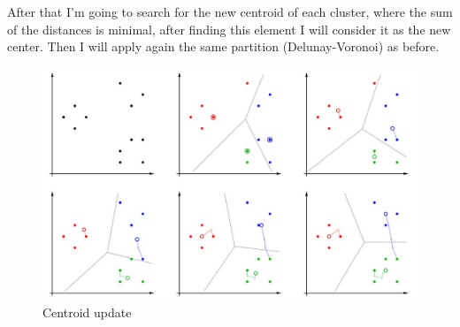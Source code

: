 \documentclass{article}
\begin{document}
After that I'm going to search for the new centroid of each cluster, where the sum of the
distances is minimal, after finding this element I will consider it as the new center.
Then I will apply again the same partition (Delunay-Voronoi) as before.
\begin{figure}[H]
    \centering
    \includegraphics[scale=0.4]{images/c-means2.png}
    \caption{Centroid update}
\end{figure}

\pagebreak
\end{document}
